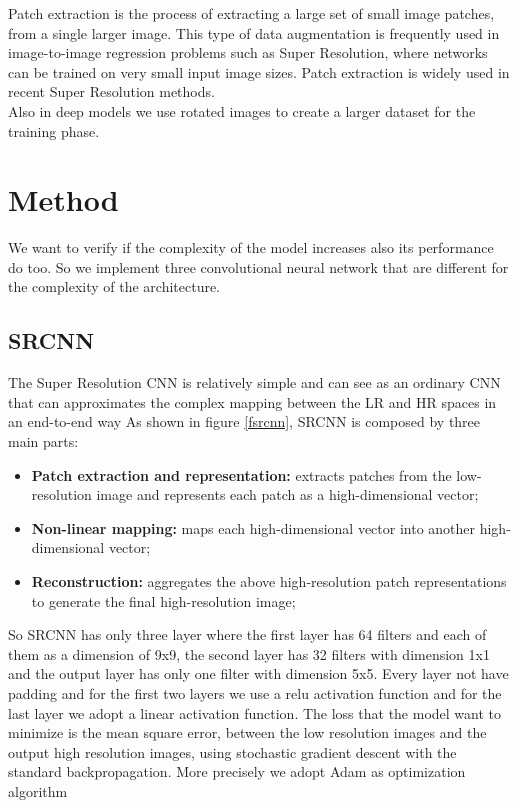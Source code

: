 \documentclass[10pt,twocolumn,letterpaper]{article}
\begin{document}
Patch extraction is the process of extracting a large set of small image patches,  from a single larger image. This type of data augmentation is frequently used in image-to-image regression problems such as Super Resolution, where networks can be trained on very small input image sizes.
Patch extraction is widely used  in recent Super Resolution methods.\\
Also in deep models we use rotated images to create a larger dataset for the training phase.\\


\section{Method}
We want to verify if the complexity of the model increases also its performance do too. So we implement three convolutional neural network that are different for the complexity of the architecture.
\subsection{SRCNN}
The Super Resolution CNN \cite{dong2014image} is relatively simple and can see as an ordinary CNN that can approximates the complex mapping between the LR and HR spaces in an end-to-end way
As shown in figure \ref{fsrcnn}, SRCNN is composed by three main parts:
\begin{itemize}
	\item \textbf{Patch extraction and representation:} extracts patches from the low-resolution image  and represents each patch as a high-dimensional vector;
	\item \textbf{Non-linear mapping:} maps each high-dimensional vector into another high-dimensional vector;
	 \item \textbf{Reconstruction:} aggregates the above high-resolution patch representations to generate the final high-resolution image;
\end{itemize}
So SRCNN has only three layer where the first layer has 64 filters and each of them as a dimension of 9x9, the second layer has 32 filters with dimension 1x1 and the output layer has only one filter with dimension 5x5. Every layer not have padding and for the first two layers we use a relu activation function and for the last layer we adopt a linear activation function. The loss that the model want to minimize is the mean square error, between the low resolution images and the output high resolution images, using stochastic gradient descent with the standard backpropagation. More precisely we adopt Adam as optimization algorithm 
\end{document}
